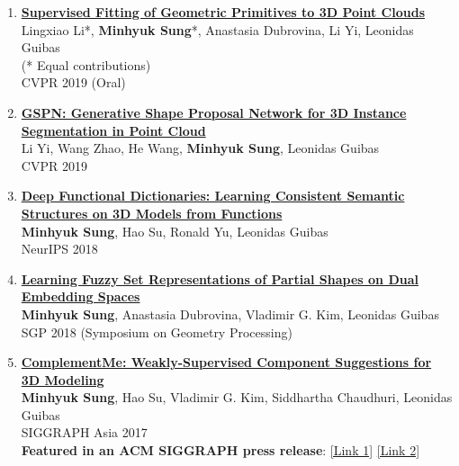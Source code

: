 \documentclass[letterpaper,10pt]{article} %
\newcommand{\blankline}{\quad\pagebreak[2]}
\begin{document}
{\begin{enumerate}
\item \label{cvpr19_2}
\href{https://arxiv.org/abs/1811.08988}{\textbf{Supervised Fitting of Geometric Primitives to 3D Point Clouds}}\\
Lingxiao Li*, \textbf{Minhyuk Sung}*, Anastasia Dubrovina, Li Yi, Leonidas Guibas\\
(* Equal contributions)\\
CVPR 2019 (Oral)\\
\blankline

\item \label{cvpr19_1}
\href{https://arxiv.org/abs/1812.03320}{\textbf{GSPN: Generative Shape Proposal Network for 3D Instance Segmentation in Point Cloud}}\\
Li Yi, Wang Zhao, He Wang, \textbf{Minhyuk Sung}, Leonidas Guibas\\
CVPR 2019\\
\blankline

\item \label{neurips18}
\href{https://arxiv.org/abs/1805.09957}{\textbf{Deep Functional Dictionaries: Learning Consistent Semantic Structures on 3D Models from Functions}}\\
\textbf{Minhyuk Sung}, Hao Su, Ronald Yu, Leonidas Guibas\\
NeurIPS 2018\\
\blankline

\item \label{sgp18}
\href{https://mhsung.github.io/fuzzy-set-dual}{\textbf{Learning Fuzzy Set Representations of Partial Shapes on Dual Embedding Spaces}}\\
\textbf{Minhyuk Sung}, Anastasia Dubrovina, Vladimir G. Kim, Leonidas Guibas\\
SGP 2018 (Symposium on Geometry Processing)\\
\blankline

\item \label{siggraphasia17}
\href{https://mhsung.github.io/complement-me.html}{\textbf{ComplementMe: Weakly-Supervised Component Suggestions for 3D Modeling}}\\
\textbf{Minhyuk Sung}, Hao Su, Vladimir G. Kim, Siddhartha Chaudhuri, Leonidas Guibas\\
SIGGRAPH Asia 2017\\
{\color{linkcolor}
\textbf{Featured in an ACM SIGGRAPH press release}:
\href{https://www.eurekalert.org/pub_releases/2017-11/afcm-sad120417.php}{[Link 1]}
\href{https://scienmag.com/simplifying-assembly-based-design-for-3-d-modeling/}{[Link 2]}
}\\
\blankline


\end{enumerate}}
\end{document}
